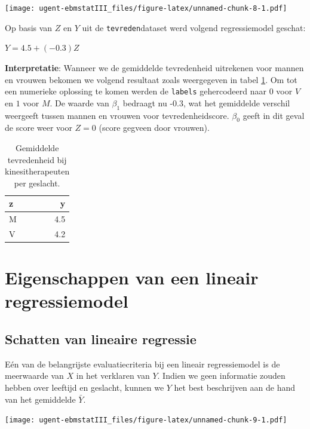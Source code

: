 \documentclass[
]{book}
\theoremstyle{definition}
\theoremstyle{definition}
\theoremstyle{definition}
\theoremstyle{definition}
\theoremstyle{remark}
\begin{document}
\texttt{[image: ugent-ebmstatIII\_files/figure-latex/unnamed-chunk-8-1.pdf]}

Op basis van \(Z\) en \(Y\) uit de \texttt{tevreden}dataset werd volgend regressiemodel geschat:

\(Y = 4.5 + (-0.3)Z\)

\textbf{Interpretatie}: Wanneer we de gemiddelde tevredenheid uitrekenen voor mannen en vrouwen bekomen we volgend resultaat zoals weergegeven in tabel \ref{tab:tevredenmean}. Om tot een numerieke oplossing te komen werden de \texttt{labels} gehercodeerd naar \(0\) voor \(V\) en \(1\) voor \(M\). De waarde van \(\beta_1\) bedraagt nu -0.3, wat het gemiddelde verschil weergeeft tussen mannen en vrouwen voor tevredenheidscore. \(\beta_0\) geeft in dit geval de score weer voor \(Z=0\) (score gegveen door vrouwen).

\begin{table}

\caption{\label{tab:tevredenmean}Gemiddelde tevredenheid bij kinesitherapeuten per geslacht.}
\centering
\begin{tabular}[t]{lr}
\toprule
z & y\\
\midrule
M & 4.5\\
V & 4.2\\
\bottomrule
\end{tabular}
\end{table}

\hypertarget{eigenschappen-van-een-lineair-regressiemodel}{%
\section*{Eigenschappen van een lineair regressiemodel}\label{eigenschappen-van-een-lineair-regressiemodel}}


\hypertarget{schatten-van-lineaire-regressie}{%
\subsection*{Schatten van lineaire regressie}\label{schatten-van-lineaire-regressie}}


Eén van de belangrijste evaluatiecriteria bij een lineair regressiemodel is de meerwaarde van \(X\) in het verklaren van \(Y\). Indien we geen informatie zouden hebben over leeftijd en geslacht, kunnen we \(Y\) het best beschrijven aan de hand van het gemiddelde \(\bar{Y}\).

\texttt{[image: ugent-ebmstatIII\_files/figure-latex/unnamed-chunk-9-1.pdf]}
\end{document}
